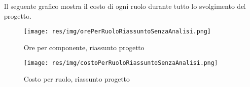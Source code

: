Il seguente grafico mostra il costo di ogni ruolo durante tutto lo svolgimento del progetto.

\begin{figure}[H]
  \begin{center}
    \texttt{[image: res/img/orePerRuoloRiassuntoSenzaAnalisi.png]}
  \caption{Ore per componente, riassunto progetto}
  \end{center} 
\end{figure}  

\begin{figure}[H]
  \begin{center}
    \texttt{[image: res/img/costoPerRuoloRiassuntoSenzaAnalisi.png]}
  \caption{Costo per ruolo, riassunto progetto}
  \end{center} 
\end{figure}  

